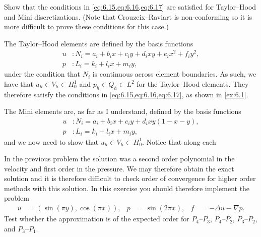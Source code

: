 \begin{exercise}{6.2}
    Show that the conditions in \cref{eq:6.15,eq:6.16,eq:6.17} are satisfied for Taylor--Hood and Mini discretizations. %
    (Note that Crouzeix--Raviart is non-conforming so it is more difficult to prove these conditions for this case.) %
\end{exercise}

\begin{solution}{6.2}
    The Taylor--Hood elements are defined by the basis functions %
    \begin{equation}
        \begin{split}
            u &: N_i = a_i + b_i x + c_i y + d_i x y + e_i x^2 + f_i y^2, \\
            p &: L_i = k_i + l_i x + m_i y,
        \end{split}
    \end{equation}
    under the condition that $N_i$ is continuous across element boundaries.
    As such, we have that $u_h \in V_h \subset H^1_0$ and $p_h \in Q_h \subset L^2$ for the Taylor--Hood elements. %
    They therefore satisfy the conditions in \cref{eq:6.15,eq:6.16,eq:6.17}, as shown in \cref{ex:6.1}.

    The Mini elements are, as far as I understand, defined by the basis functions
    \begin{equation}
        \begin{split}
            u &: N_i = a_i + b_i x + c_i y + d_i xy(1 - x - y), \\
            p &: L_i = k_i + l_i x + m_i y,
        \end{split}
    \end{equation}
    and we now need to show that $u_h \in V_h \subset H^1_0$.
    Notice that along each
\end{solution}

\begin{exercise}{6.6}
    In the previous problem the solution was a second order polynomial in the velocity and first order in the pressure.
    We may therefore obtain the exact solution and it is therefore difficult to check order of convergence for higher order methods with this solution.
    In this exercise you should therefore implement the problem
    \begin{align*}
        u &= (\sin(\pi y), \cos(\pi x)),
        & p &= \sin(2 \pi x),
        & f &= -\Delta u - \nabla p.
    \end{align*}
    Test whether the approximation is of the expected order for $P_4$--$P_3$, $P_4$--$P_2$, $P_3$--$P_2$, and $P_3$--$P_1$.
\end{exercise}

